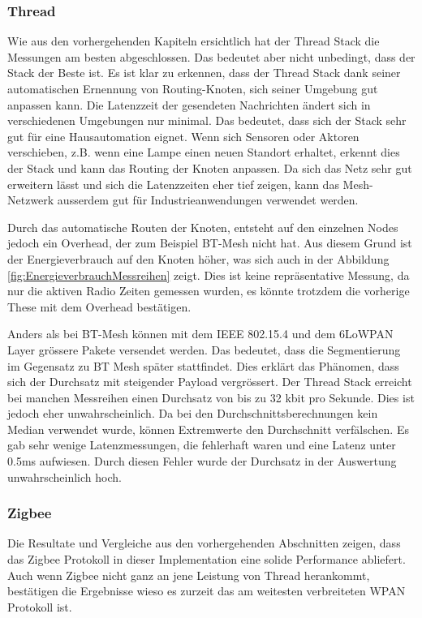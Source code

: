 \subsubsection{Thread}\label{subsubsec:FazitThread}
Wie aus den vorhergehenden Kapiteln ersichtlich hat der Thread Stack die Messungen am besten abgeschlossen. Das bedeutet aber nicht unbedingt, dass der Stack der Beste ist. Es ist klar zu erkennen, dass der Thread Stack dank seiner automatischen Ernennung von Routing-Knoten, sich seiner Umgebung gut anpassen kann. Die Latenzzeit der gesendeten Nachrichten ändert sich in verschiedenen Umgebungen nur minimal. Das bedeutet, dass sich der Stack sehr gut für eine Hausautomation eignet. Wenn sich Sensoren oder Aktoren verschieben, z.B. wenn eine Lampe einen neuen Standort erhaltet, erkennt dies der Stack und kann das Routing der Knoten anpassen. Da sich das Netz sehr gut erweitern lässt und sich die Latenzzeiten eher tief zeigen, kann das Mesh-Netzwerk ausserdem gut für Industrieanwendungen verwendet werden. 

Durch das automatische Routen der Knoten, entsteht auf den einzelnen Nodes jedoch ein Overhead, der zum Beispiel BT-Mesh nicht hat. Aus diesem Grund ist der Energieverbrauch auf den Knoten höher, was sich auch in der Abbildung \ref{fig:EnergieverbrauchMessreihen} zeigt. Dies ist keine repräsentative Messung, da nur die aktiven Radio Zeiten gemessen wurden, es könnte trotzdem die vorherige These mit dem Overhead bestätigen. 

Anders als bei BT-Mesh können mit dem IEEE 802.15.4 und dem 6LoWPAN Layer grössere Pakete versendet werden. Das bedeutet, dass die Segmentierung im Gegensatz zu BT Mesh später stattfindet. Dies erklärt das Phänomen, dass sich der Durchsatz mit steigender Payload vergrössert. Der Thread Stack erreicht bei manchen Messreihen einen Durchsatz von bis zu 32 kbit pro Sekunde. Dies ist jedoch eher unwahrscheinlich. Da bei den Durchschnittsberechnungen kein Median verwendet wurde, können Extremwerte den Durchschnitt verfälschen. Es gab sehr wenige Latenzmessungen, die fehlerhaft waren und eine Latenz unter 0.5ms aufwiesen. Durch diesen Fehler wurde der Durchsatz in der Auswertung unwahrscheinlich hoch. 

\subsubsection{Zigbee}\label{subsubsec:FazitZigbee}
Die Resultate und Vergleiche aus den vorhergehenden Abschnitten zeigen, dass das Zigbee Protokoll in dieser Implementation eine solide Performance abliefert.
Auch wenn Zigbee nicht ganz an jene Leistung von Thread herankommt, bestätigen die Ergebnisse wieso es zurzeit das am weitesten verbreiteten WPAN Protokoll ist.

